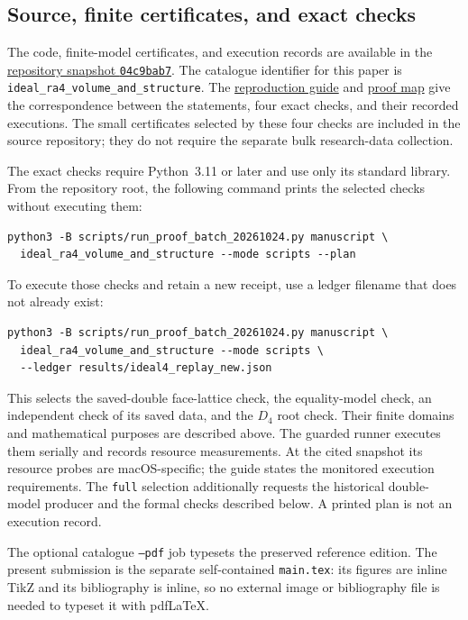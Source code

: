 \documentclass[11pt]{article}
\theoremstyle{remark}
\begin{document}
\subsection{Source, finite certificates, and exact checks}

The code, finite-model certificates, and execution records are
available in the
\href{https://github.com/sashakolpakov/CoxeterPolytopes/tree/04c9bab7}{repository snapshot \texttt{04c9bab7}}.
The catalogue identifier for this paper is
\texttt{ideal\_ra4\_volume\_and\_structure}. The
\href{https://github.com/sashakolpakov/CoxeterPolytopes/blob/04c9bab7/docs/right_angled_release_packages_20261025.md}{reproduction guide}
and
\href{https://github.com/sashakolpakov/CoxeterPolytopes/blob/04c9bab7/docs/ideal_ra4_volume_and_structure_proof_map.md}{proof map}
give the correspondence between the statements, four exact checks,
and their recorded executions. The small certificates selected by
these four checks are included in the source repository; they do
not require the separate bulk research-data collection.

The exact checks require Python~3.11 or later and use only its
standard library. From the repository root, the following command
prints the selected checks without executing them:
\begin{verbatim}
python3 -B scripts/run_proof_batch_20261024.py manuscript \
  ideal_ra4_volume_and_structure --mode scripts --plan
\end{verbatim}
To execute those checks and retain a new receipt, use a ledger
filename that does not already exist:
\begin{verbatim}
python3 -B scripts/run_proof_batch_20261024.py manuscript \
  ideal_ra4_volume_and_structure --mode scripts \
  --ledger results/ideal4_replay_new.json
\end{verbatim}
This selects the saved-double face-lattice check, the equality-model
check, an independent check of its saved data, and the $D_4$ root
check. Their finite domains and mathematical purposes are described
above. The guarded runner executes them serially and records
resource measurements. At the cited snapshot its resource probes
are macOS-specific; the guide states the monitored execution
requirements. The \texttt{full} selection additionally requests the
historical double-model producer and the formal checks described
below. A printed plan is not an execution record.

The optional catalogue \texttt{--pdf} job typesets the preserved
reference edition. The present submission is the separate
self-contained \texttt{main.tex}: its figures are inline TikZ and
its bibliography is inline, so no external image or bibliography
file is needed to typeset it with pdf\LaTeX.
\end{document}
